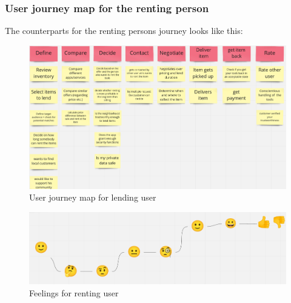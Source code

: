 		\subsubsection{User journey map for the renting person}
			The counterparts for the renting persons journey looks like this:
			
			\begin{figure}[H]
				\centering
				\includegraphics[width=\linewidth]{abb/2_context_of_use/user_journey_map_lending.png}
				\caption{User journey map for lending user}
				\label{fig:ujm_lending}
			\end{figure}
		
			\begin{figure}[H]
				\centering
				\includegraphics[width=\linewidth]{abb/2_context_of_use/feelings_lending.png}
				\caption{Feelings for renting user}
				\label{fig:ujm_lending_feelings}
			\end{figure}